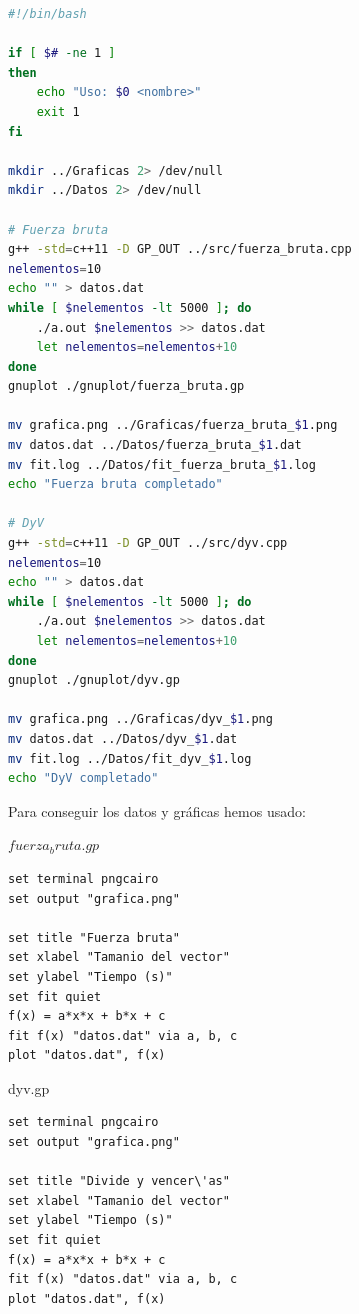 \begin{lstlisting}[language=bash]
#!/bin/bash

if [ $# -ne 1 ]
then
    echo "Uso: $0 <nombre>"
    exit 1
fi

mkdir ../Graficas 2> /dev/null
mkdir ../Datos 2> /dev/null

# Fuerza bruta
g++ -std=c++11 -D GP_OUT ../src/fuerza_bruta.cpp
nelementos=10
echo "" > datos.dat
while [ $nelementos -lt 5000 ]; do
    ./a.out $nelementos >> datos.dat
    let nelementos=nelementos+10
done
gnuplot ./gnuplot/fuerza_bruta.gp

mv grafica.png ../Graficas/fuerza_bruta_$1.png
mv datos.dat ../Datos/fuerza_bruta_$1.dat
mv fit.log ../Datos/fit_fuerza_bruta_$1.log
echo "Fuerza bruta completado"

# DyV
g++ -std=c++11 -D GP_OUT ../src/dyv.cpp
nelementos=10
echo "" > datos.dat
while [ $nelementos -lt 5000 ]; do
    ./a.out $nelementos >> datos.dat
    let nelementos=nelementos+10
done
gnuplot ./gnuplot/dyv.gp

mv grafica.png ../Graficas/dyv_$1.png
mv datos.dat ../Datos/dyv_$1.dat
mv fit.log ../Datos/fit_dyv_$1.log
echo "DyV completado"

\end{lstlisting}

Para conseguir los datos y gr\'aficas hemos usado:

\begin{center}
	$fuerza_bruta.gp$
\end{center}

\begin{lstlisting}[language=gnuplot]
set terminal pngcairo
set output "grafica.png"

set title "Fuerza bruta"
set xlabel "Tamanio del vector"
set ylabel "Tiempo (s)"
set fit quiet
f(x) = a*x*x + b*x + c
fit f(x) "datos.dat" via a, b, c
plot "datos.dat", f(x)
\end{lstlisting}


\begin{center}
	dyv.gp
\end{center}

\begin{lstlisting}[language=gnuplot]
set terminal pngcairo
set output "grafica.png"

set title "Divide y vencer\'as"
set xlabel "Tamanio del vector"
set ylabel "Tiempo (s)"
set fit quiet
f(x) = a*x*x + b*x + c
fit f(x) "datos.dat" via a, b, c
plot "datos.dat", f(x)
\end{lstlisting}



